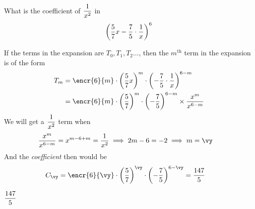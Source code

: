 



\SUBTRACT\vc\vd\vx
\DIVIDE{}\vy

\question[3] What is the coefficient of $\dfrac{1}{x^2}$ in 
  \[ \left( \dfrac{5}{7} x - \dfrac{7}{5}\cdot\dfrac{1}{x} \right)^{6} \] 


\watchout

\begin{solution}[\halfpage]
  If the terms in the expansion are $T_0, T_1, T_2 \ldots$, then the $m^{\text{th}}$ term 
  in the expansion is of the form 
	\begin{align}
	   T_m &= \encr{\vc}{m}\cdot\left( \va x \right)^{m}\cdot\left( -\vb\cdot\dfrac{1}{x}\right)^{\vc - m} \\
	   &= \encr{\vc}{m}\cdot\left(\va\right)^{m}\cdot\left( -\vb \right)^{\vc - m}\times\dfrac{x^m}{x^{\vc - m}}
	\end{align}
	We will get a $\dfrac{1}{x^{2}}$ term when 
	\begin{align}
		\dfrac{x^m}{x^{\vc - m}} &= x^{m-\vc + m} = \dfrac{1}{x^\vd} \implies 2m - \vc = -\vd \implies m = \vy
	\end{align}
	And the \textit{coefficient} then would be 
	\begin{align}
		C_{\vy} &= \encr{\vc}{\vy}\cdot\left(\va\right)^{\vy}\cdot\left( -\vb \right)^{\vc - \vy} = \ve
	\end{align}
\end{solution}

\ifprintanswers\begin{codex}$\dfrac{147}{5}$\end{codex}\fi
